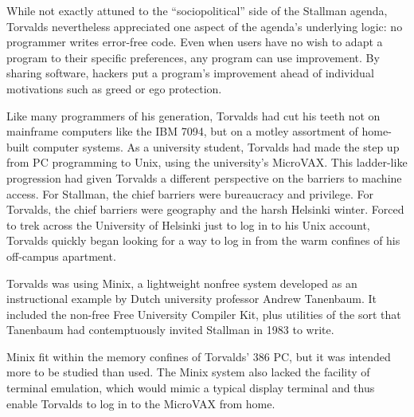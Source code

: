 While not exactly attuned to the ``sociopolitical'' side of the Stallman agenda, Torvalds nevertheless appreciated one aspect of the agenda's underlying logic: no programmer writes error-free code. Even when users have no wish to adapt a program to their specific preferences, any program can use improvement. By sharing software, hackers put a program's improvement ahead of individual motivations such as greed or ego protection.

Like many programmers of his generation, Torvalds had cut his teeth not on mainframe computers like the IBM 7094, but on a motley assortment of home-built computer systems. As a university student, Torvalds had made the step up from PC programming to Unix, using the university's MicroVAX. This ladder-like progression had given Torvalds a different perspective on the barriers to machine access. For Stallman, the chief barriers were bureaucracy and privilege. For Torvalds, the chief barriers were geography and the harsh Helsinki winter. Forced to trek across the University of Helsinki just to log in to his Unix account, Torvalds quickly began looking for a way to log in from the warm confines of his off-campus apartment.

Torvalds was using Minix, a lightweight nonfree system developed as an instructional example by Dutch university professor Andrew Tanenbaum. It included the non-free Free University Compiler Kit, plus utilities of the sort that Tanenbaum had contemptuously invited Stallman in 1983 to write.

Minix fit within the memory confines of Torvalds' 386 PC, but it was intended more to be studied than used.  The Minix system also lacked the facility of terminal emulation, which would mimic a typical display terminal and thus enable Torvalds to log in to the MicroVAX from home.

